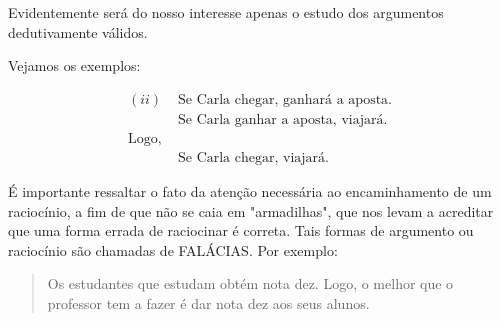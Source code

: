 Evidentemente será do nosso interesse apenas o estudo dos argumentos dedutivamente válidos.

Vejamos os exemplos:

\begin{align*}
    (ii) & \text{ Se Carla chegar, ganhará a aposta.}\\
         & \text{ Se Carla ganhar a aposta, viajará.}\\
    \text{Logo,}\\
         & \text{ Se Carla chegar, viajará.}
\end{align*}

É importante ressaltar o fato da atenção necessária ao encaminhamento de um raciocínio, a fim de que não se caia em "armadilhas", que nos levam a acreditar que uma forma errada de raciocinar é correta. Tais formas de argumento ou raciocínio são chamadas de FALÁCIAS. Por exemplo:

\begin{quote}
    Os estudantes que estudam obtém nota dez. Logo, o melhor que o professor tem a fazer é dar nota dez aos seus alunos.
\end{quote}
